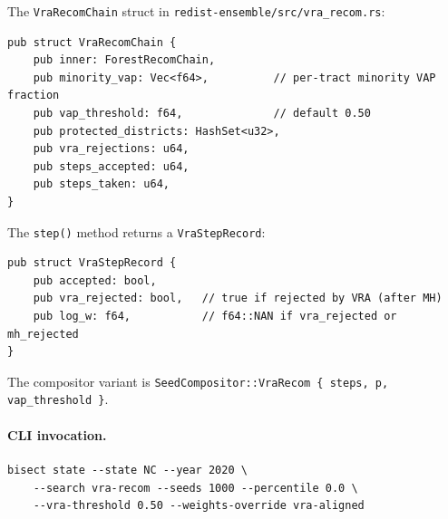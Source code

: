 The \texttt{VraRecomChain} struct in \texttt{redist-ensemble/src/vra\_recom.rs}:

\begin{verbatim}
pub struct VraRecomChain {
    pub inner: ForestRecomChain,
    pub minority_vap: Vec<f64>,          // per-tract minority VAP fraction
    pub vap_threshold: f64,              // default 0.50
    pub protected_districts: HashSet<u32>,
    pub vra_rejections: u64,
    pub steps_accepted: u64,
    pub steps_taken: u64,
}
\end{verbatim}

The \texttt{step()} method returns a \texttt{VraStepRecord}:

\begin{verbatim}
pub struct VraStepRecord {
    pub accepted: bool,
    pub vra_rejected: bool,   // true if rejected by VRA (after MH)
    pub log_w: f64,           // f64::NAN if vra_rejected or mh_rejected
}
\end{verbatim}

The compositor variant is \texttt{SeedCompositor::VraRecom \{ steps, p, vap\_threshold \}}.

\paragraph{CLI invocation.}
\begin{verbatim}
bisect state --state NC --year 2020 \
    --search vra-recom --seeds 1000 --percentile 0.0 \
    --vra-threshold 0.50 --weights-override vra-aligned
\end{verbatim}

